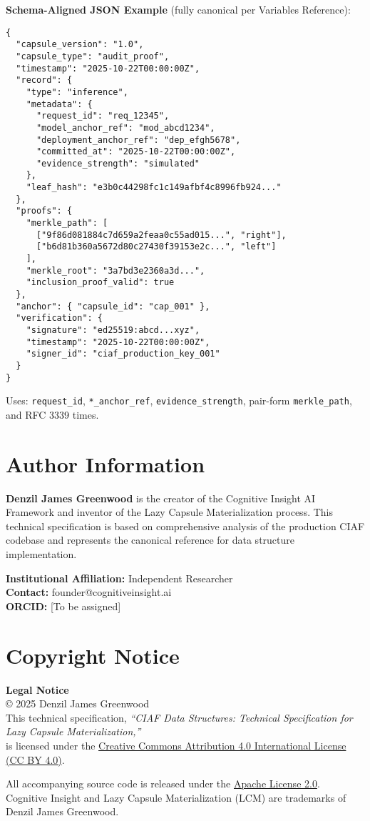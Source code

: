 \documentclass[12pt,a4paper]{article}
\begin{document}
\textbf{Schema-Aligned JSON Example} (fully canonical per Variables Reference):

\begin{lstlisting}[caption=Canonical JSON Example]
{
  "capsule_version": "1.0",
  "capsule_type": "audit_proof",
  "timestamp": "2025-10-22T00:00:00Z",
  "record": {
    "type": "inference",
    "metadata": {
      "request_id": "req_12345",
      "model_anchor_ref": "mod_abcd1234",
      "deployment_anchor_ref": "dep_efgh5678",
      "committed_at": "2025-10-22T00:00:00Z",
      "evidence_strength": "simulated"
    },
    "leaf_hash": "e3b0c44298fc1c149afbf4c8996fb924..."
  },
  "proofs": {
    "merkle_path": [
      ["9f86d081884c7d659a2feaa0c55ad015...", "right"],
      ["b6d81b360a5672d80c27430f39153e2c...", "left"]
    ],
    "merkle_root": "3a7bd3e2360a3d...",
    "inclusion_proof_valid": true
  },
  "anchor": { "capsule_id": "cap_001" },
  "verification": {
    "signature": "ed25519:abcd...xyz",
    "timestamp": "2025-10-22T00:00:00Z",
    "signer_id": "ciaf_production_key_001"
  }
}
\end{lstlisting}

Uses: \texttt{request\_id}, \texttt{*\_anchor\_ref}, \texttt{evidence\_strength}, pair-form \texttt{merkle\_path}, and RFC 3339 times.

\newpage

\section*{Author Information}

\textbf{Denzil James Greenwood} is the creator of the Cognitive Insight AI Framework and inventor of the Lazy Capsule Materialization process. This technical specification is based on comprehensive analysis of the production CIAF codebase and represents the canonical reference for data structure implementation.

\textbf{Institutional Affiliation:} Independent Researcher \\
\textbf{Contact:} founder@cognitiveinsight.ai \\
\textbf{ORCID:} [To be assigned]

\section*{Copyright Notice}

\begin{infobox}
\textbf{Legal Notice}\\
© 2025 Denzil James Greenwood \\
This technical specification, \textit{``CIAF Data Structures: Technical Specification for Lazy Capsule Materialization,''} \\
is licensed under the \href{https://creativecommons.org/licenses/by/4.0/}{Creative Commons Attribution 4.0 International License (CC BY 4.0)}.

All accompanying source code is released under the \href{https://www.apache.org/licenses/LICENSE-2.0}{Apache License 2.0}. \\
Cognitive Insight\texttrademark{} and Lazy Capsule Materialization (LCM)\texttrademark{} are trademarks of Denzil James Greenwood.
\end{infobox}
\end{document}
